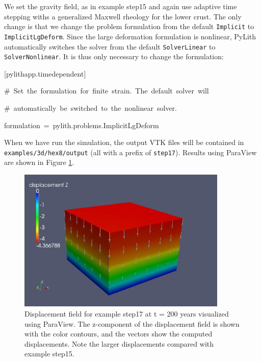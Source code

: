 We set the gravity field, as in example step15 and again use adaptive
time stepping withs a generalized Maxwell rheology for the lower crust.
The only change is that we change the problem formulation from the
default \texttt{Implicit} to \texttt{ImplicitLgDeform}. Since the
large deformation formulation is nonlinear, PyLith automatically switches
the solver from the default \texttt{SolverLinear} to \texttt{SolverNonlinear}.
It is thus only necessary to change the formulation:
\begin{lyxcode}
{[}pylithapp.timedependent{]}

\#~Set~the~formulation~for~finite~strain.~The~default~solver~will

\#~automatically~be~switched~to~the~nonlinear~solver.

formulation~=~pylith.problems.ImplicitLgDeform
\end{lyxcode}
When we have run the simulation, the output VTK files will be contained
in \texttt{examples/3d/hex8/output} (all with a prefix of \texttt{step17}).
Results using ParaView are shown in Figure \ref{fig:step17-disp-t200}.

\begin{figure}
\begin{centering}
\includegraphics[width=10cm]{tutorials/3dhex8/figs/step17-displ-t200}
\par\end{centering}

\caption{Displacement field for example step17 at t = 200 years visualized
using ParaView. The z-component of the displacement field is shown
with the color contours, and the vectors show the computed displacements.
Note the larger displacements compared with example step15.\label{fig:step17-disp-t200}}
\end{figure}

